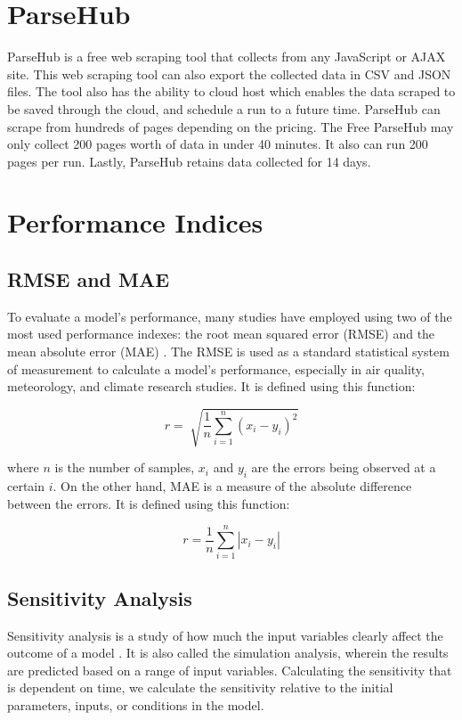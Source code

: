 \section{ParseHub}
ParseHub is a free web scraping tool that collects from any JavaScript or AJAX site. This web scraping tool can also export the collected data in CSV and JSON files. The tool also has the ability to cloud host which enables the data scraped to be saved through the cloud, and schedule a run to a future time. ParseHub can scrape from hundreds of pages depending on the pricing. The Free ParseHub may only collect 200 pages worth of data in under 40 minutes. It also can run 200 pages per run. Lastly, ParseHub retains data collected for 14 days.



\section{Performance Indices}
\subsection{RMSE and MAE}
To evaluate a model’s performance, many studies have employed using two of the most used performance indexes: the root mean squared error (RMSE) and the mean absolute error (MAE) . The RMSE is used as a standard statistical system of measurement to calculate a model's performance, especially in air quality, meteorology, and climate research studies. It is defined using this function: 

\begin {equation}
r = \sqrt[]{\frac{1}{n}\sum_{i=1}^{n}(x_i - y_i)^2}
\end{equation}

\noindent where $n$ is the number of samples, $x_i$ and $y_i$ are the errors being observed at a certain $i$. On the other hand, MAE is a measure of the absolute difference between the errors. It is defined using this function: 

\begin {equation}
r = \frac{1}{n}\sum_{i=1}^{n}|x_i - y_i|
\end{equation}

\subsection{Sensitivity Analysis}
Sensitivity analysis is a study of how much the input variables clearly affect the outcome of a model . It is also called the simulation analysis, wherein the results are predicted based on a range of input variables. Calculating the sensitivity that is dependent on time, we calculate the sensitivity relative to the initial parameters, inputs, or conditions in the model. 

